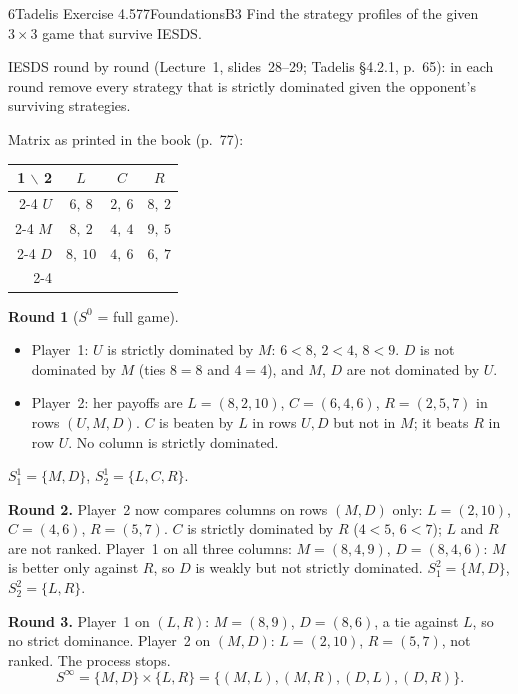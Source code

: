 \begin{exsol}{6}{Tadelis Exercise 4.5}{77}{Foundations}{B3}
\asked Find the strategy profiles of the given $3 \times 3$ game that survive IESDS.

\method IESDS round by round (Lecture~1, slides~28--29; Tadelis \S4.2.1, p.~65): in each round
remove every strategy that is strictly dominated given the opponent's surviving strategies.

\solution
Matrix as printed in the book (p.~77):
\begin{center}
\begin{tabular}{r|c|c|c|}
\multicolumn{1}{r}{1 $\backslash$ 2} & \multicolumn{1}{c}{$L$} & \multicolumn{1}{c}{$C$} & \multicolumn{1}{c}{$R$}\\ \cline{2-4}
$U$ & $6,\ 8$ & $2,\ 6$ & $8,\ 2$ \\ \cline{2-4}
$M$ & $8,\ 2$ & $4,\ 4$ & $9,\ 5$ \\ \cline{2-4}
$D$ & $8,\ 10$ & $4,\ 6$ & $6,\ 7$ \\ \cline{2-4}
\end{tabular}
\end{center}

\textbf{Round 1} ($S^0$ = full game).
\begin{itemize}
  \item Player~1: $U$ is strictly dominated by $M$: $6 < 8$, $2 < 4$, $8 < 9$. $D$ is not
  dominated by $M$ (ties $8 = 8$ and $4 = 4$), and $M$, $D$ are not dominated by $U$.
  \item Player~2: her payoffs are $L = (8, 2, 10)$, $C = (6, 4, 6)$, $R = (2, 5, 7)$ in rows
  $(U, M, D)$. $C$ is beaten by $L$ in rows $U, D$ but not in $M$; it beats $R$ in row $U$. No
  column is strictly dominated.
\end{itemize}
$S_1^1 = \{M, D\}$, $S_2^1 = \{L, C, R\}$.

\textbf{Round 2.} Player~2 now compares columns on rows $(M, D)$ only:
$L = (2, 10)$, $C = (4, 6)$, $R = (5, 7)$. $C$ is strictly dominated by $R$ ($4 < 5$, $6 < 7$);
$L$ and $R$ are not ranked. Player~1 on all three columns: $M = (8, 4, 9)$, $D = (8, 4, 6)$:
$M$ is better only against $R$, so $D$ is weakly but not strictly dominated.
$S_1^2 = \{M, D\}$, $S_2^2 = \{L, R\}$.

\textbf{Round 3.} Player~1 on $(L, R)$: $M = (8, 9)$, $D = (8, 6)$, a tie against $L$, so no
strict dominance. Player~2 on $(M, D)$: $L = (2, 10)$, $R = (5, 7)$, not ranked. The process
stops.
\[
  S^\infty = \{M, D\} \times \{L, R\} = \{(M,L), (M,R), (D,L), (D,R)\}.
\]


\end{exsol}
